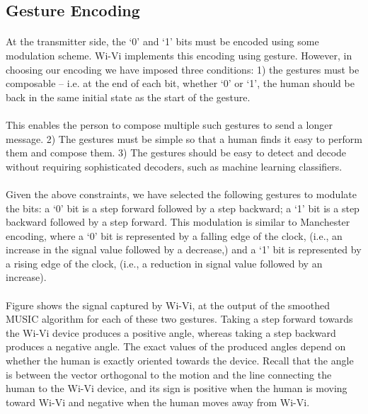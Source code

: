\documentclass[a4paper,12pt,oneside]{article}
\begin{document}
\subsection{Gesture Encoding}
\paragraph{}
At the transmitter side, the ‘0’ and ‘1’ bits must be encoded using some modulation
scheme. Wi-Vi implements this encoding using gesture. However, in choosing our encoding we have imposed three
conditions: 1) the gestures must be composable – i.e. at the end of each bit, whether ‘0’ or ‘1’,
the human should be back in the same initial state as the start of the gesture.
\paragraph{}
This enables the person to compose multiple such gestures to send a longer message. 2)
The gestures must be simple so that a human finds it easy to perform them and compose them. 3)
The gestures should be easy to detect and decode without requiring sophisticated decoders, such
as machine learning classifiers.



\paragraph{}
Given the above constraints, we have selected the following gestures to modulate the bits:
a ‘0’ bit is a step forward followed by a step backward; a ‘1’ bit is a step backward followed by a
step forward. This modulation is similar to Manchester encoding, where a ‘0’ bit is represented
by a falling edge of the clock, (i.e., an increase in the signal value followed by a decrease,) and a
‘1’ bit is represented by a rising edge of the clock, (i.e., a reduction in signal value followed by
an increase).
\paragraph{}
Figure shows the signal captured by Wi-Vi, at the output of the smoothed MUSIC
algorithm for each of these two gestures. Taking a step forward towards the Wi-Vi device
produces a positive angle, whereas taking a step backward produces a negative angle. The exact
values of the produced angles depend on whether the human is exactly oriented towards the
device. Recall that the angle is between the vector orthogonal to the motion and the line
connecting the human to the Wi-Vi device, and its sign is positive when the human is moving
toward Wi-Vi and negative when the human moves away from Wi-Vi.
\end{document}
